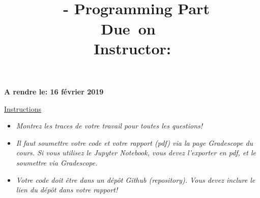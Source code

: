 \documentclass[12pt]{article}
\title{
    \vspace{0in}
    \textmd{\textbf{\hmwkClass}}\\
    \hmwkTitle \ - Programming Part\\
    \normalsize\vspace{0.1in}\small{Due\ on\ \hmwkDueDate}\\
    \vspace{0.1in}\large{Instructor: \textit{\hmwkClassInstructor\\}} 
    \vspace{0in}
}
\begin{document}
\fancyhead{}
\fancyfoot{}


{\bf A rendre le: 16 février 2019}

\vspace{-0.5cm}
\underline{Instructions}
\renewcommand{\labelitemi}{\textbullet}
\begin{itemize}
\item \emph{Montrez les traces de votre travail pour toutes les questions!}
\item \emph{Il faut soumettre votre code et votre rapport (pdf) via la page Gradescope du cours. Si vous utilisez le Jupyter Notebook, vous devez l'exporter en pdf, et le soumettre via Gradescope.}
\item \emph{Votre code doit être dans un dépôt Github (\textit{repository}). Vous devez inclure le lien du dépôt dans votre rapport!}
\end{itemize}
\end{document}
